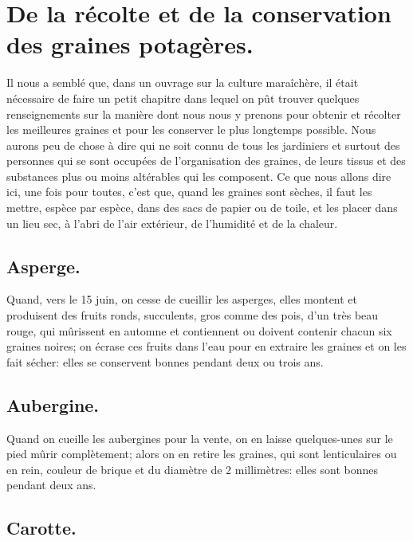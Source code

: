 \documentclass[10pt,a4paper]{book}
\begin{document}
\chapter{De la récolte et de la conservation des graines potagères.}

Il nous a semblé que, dans un ouvrage sur la culture maraîchère, il était nécessaire de faire un petit chapitre dans lequel on pût trouver quelques renseignements sur la manière dont nous nous y prenons pour obtenir et récolter les meilleures graines et pour les conserver le plus longtemps possible. Nous aurons peu de chose à dire qui ne soit connu de tous les jardiniers et surtout des personnes qui se sont occupées de l'organisation des graines, de leurs tissus et des substances plus ou moins altérables qui les composent. Ce que nous allons dire ici, une fois pour toutes, c'est que, quand les graines sont sèches, il faut les mettre, espèce par espèce, dans des sacs de papier ou de toile, et les placer dans un lieu sec, à l'abri de l'air extérieur, de l'humidité et de la chaleur.

\section{Asperge.}

Quand, vers le 15 juin, on cesse de cueillir les asperges, elles montent et produisent des fruits ronds, succulents, gros comme des pois, d'un très beau rouge, qui mûrissent en automne et contiennent ou doivent contenir chacun six graines noires; on écrase ces fruits dans l'eau pour en extraire les graines et on les fait sécher: elles se conservent bonnes pendant deux ou trois ans.

\section{Aubergine.}

Quand on cueille les aubergines pour la vente, on en laisse quelques-unes sur le pied mûrir complètement; alors on en retire les graines, qui sont lenticulaires ou en rein, couleur de brique et du diamètre de 2 millimètres: elles sont bonnes pendant deux ans.

\section{Carotte.}
\end{document}
